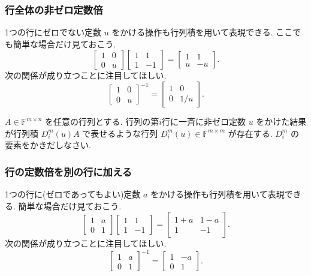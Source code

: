 \documentclass[a4paper]{scrbook}
\theoremstyle{definition}
\let\BeginKnitrBlock\begin \let\EndKnitrBlock\end
\begin{document}
\subsubsection*{行全体の非ゼロ定数倍}

1つの行にゼロでない定数 \(u\) をかける操作も行列積を用いて表現できる.
ここでも簡単な場合だけ見ておこう. \[
\begin{bmatrix}1 & 0\\
0 & u
\end{bmatrix}\begin{bmatrix}1 & 1\\
1 & -1
\end{bmatrix}=\begin{bmatrix}1 & 1\\
u & -u
\end{bmatrix}.
\] 次の関係が成り立つことに注目してほしい. \[
\begin{bmatrix}1 & 0\\
0 & u
\end{bmatrix}^{-1}=\begin{bmatrix}1 & 0\\
0 & 1/u
\end{bmatrix}.
\]

\BeginKnitrBlock{exercise}
\(A\in\mathbb{F}^{m\times n}\) を任意の行列とする.
行列の第\(i\)行に一斉に非ゼロ定数 \(u\) をかけた結果が行列積
\(D_{i}^{m}(u)A\) で表せるような行列
\(D_{i}^{m}(u)\in\mathbb{F}^{m\times m}\) が存在する. \(D_{i}^{m}\)
の要素をかきだしなさい.
\EndKnitrBlock{exercise}

\subsubsection*{行の定数倍を別の行に加える}

1つの行に(ゼロであってもよい)定数 \(a\)
をかける操作も行列積を用いて表現できる. 簡単な場合だけ見ておこう. \[
\begin{bmatrix}1 & a\\
0 & 1
\end{bmatrix}\begin{bmatrix}1 & 1\\
1 & -1
\end{bmatrix}=\begin{bmatrix}1+a & 1-a\\
1 & -1
\end{bmatrix}.
\] 次の関係が成り立つことに注目してほしい. \[
\begin{bmatrix}1 & a\\
0 & 1
\end{bmatrix}^{-1}=\begin{bmatrix}1 & -a\\
0 & 1
\end{bmatrix}.
\]
\end{document}
